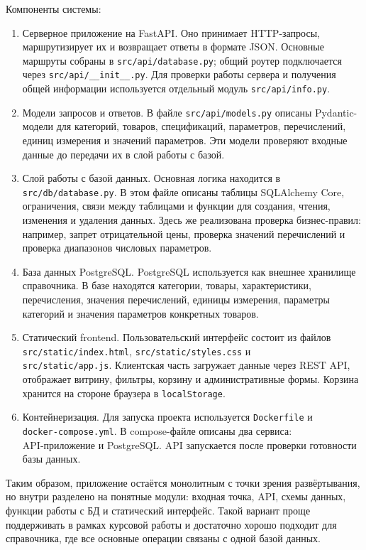 \documentclass[a4paper,14pt]{extarticle}
\begin{document}
Компоненты системы:
\begin{enumerate}
    \item Серверное приложение на FastAPI. Оно принимает HTTP-запросы, маршрутизирует их и возвращает ответы в формате JSON. Основные маршруты собраны в \texttt{src/api/database.py}; общий роутер подключается через \texttt{src/api/\_\_init\_\_.py}. Для проверки работы сервера и получения общей информации используется отдельный модуль \texttt{src/api/info.py}.
    \item Модели запросов и ответов. В файле \texttt{src/api/models.py} описаны Pydantic-модели для категорий, товаров, спецификаций, параметров, перечислений, единиц измерения и значений параметров. Эти модели проверяют входные данные до передачи их в слой работы с базой.
    \item Слой работы с базой данных. Основная логика находится в \\ \texttt{src/db/database.py}. В этом файле описаны таблицы SQLAlchemy Core, ограничения, связи между таблицами и функции для создания, чтения, изменения и удаления данных. Здесь же реализована проверка бизнес-правил: например, запрет отрицательной цены, проверка значений перечислений и проверка диапазонов числовых параметров.
    \item База данных PostgreSQL. PostgreSQL используется как внешнее хранилище справочника. В базе находятся категории, товары, характеристики, перечисления, значения перечислений, единицы измерения, параметры категорий и значения параметров конкретных товаров.
    \item Статический frontend. Пользовательский интерфейс состоит из файлов \texttt{src/static/index.html}, \texttt{src/static/styles.css} и \\ \texttt{src/static/app.js}. Клиентская часть загружает данные через REST API, отображает витрину, фильтры, корзину и административные формы. Корзина хранится на стороне браузера в \texttt{localStorage}.
    \item Контейнеризация. Для запуска проекта используется \texttt{Dockerfile} и \\ \texttt{docker-compose.yml}. В compose-файле описаны два сервиса: \\ API-приложение и PostgreSQL. API запускается после проверки готовности базы данных.
\end{enumerate}

Таким образом, приложение остаётся монолитным с точки зрения развёртывания, но внутри разделено на понятные модули: входная точка, API, схемы данных, функции работы с БД и статический интерфейс. Такой вариант проще поддерживать в рамках курсовой работы и достаточно хорошо подходит для справочника, где все основные операции связаны с одной базой данных.
\end{document}
